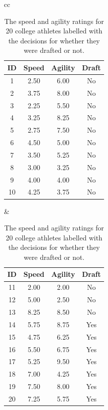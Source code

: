 \documentclass[xcolor={table}]{beamer}
\begin{document}
 \begin{frame} 
\begin{table}[htb]
\caption{The speed and agility ratings for 20 college athletes labelled with the decisions for whether they were drafted or not. }
\label{table:draftProspects}
\begin{footnotesize}
\centering
\begin{tabular}{cc}
		\hline
			\begin{minipage}{0.45\textwidth}
\centering
					\begin{tabular}[ht]{cccc} 
\textbf{ID}	 & \textbf{Speed} & \textbf{Agility} & \textbf{Draft}\\
\hline
1 & 2.50 & 6.00 & No\\
2 & 3.75 & 8.00 & No\\
3 & 2.25 & 5.50 & No\\
4 & 3.25 & 8.25 & No\\
5 & 2.75 & 7.50 & No\\
6 & 4.50 & 5.00 & No\\
7 & 3.50 & 5.25 & No\\
8 & 3.00 & 3.25 & No\\
9 & 4.00 & 4.00 & No\\
10 & 4.25 & 3.75 & No\\
\hline
					\end{tabular}
			\end{minipage}
			&
			\begin{minipage}{0.45\textwidth}
\centering
					\begin{tabular}[ht]{cccc} 
\textbf{ID}	 & \textbf{Speed} & \textbf{Agility} & \textbf{Draft}\\
\hline
11 & 2.00 & 2.00 & No\\
12 & 5.00 & 2.50 & No\\
13 & 8.25 & 8.50 & No\\
14 & 5.75 & 8.75 & Yes\\
15 & 4.75 & 6.25 & Yes\\
16 & 5.50 & 6.75 & Yes\\
17 & 5.25 & 9.50 & Yes\\
18 & 7.00 & 4.25 & Yes\\
19 & 7.50 & 8.00 & Yes\\
20 & 7.25 & 5.75 & Yes\\
\hline
				\end{tabular}
			\end{minipage}\\
\end{tabular}
\end{footnotesize}
\end{table}
\end{frame} 
\end{document}
